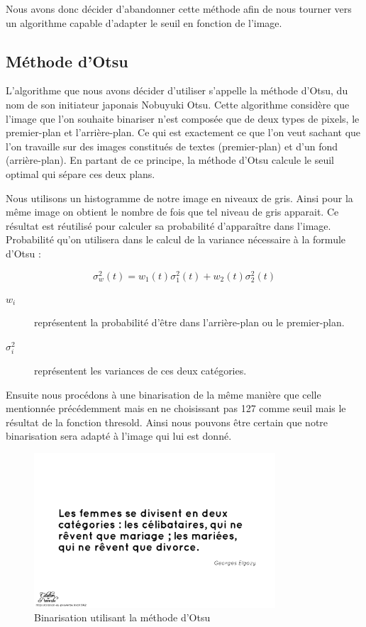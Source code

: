 \documentclass[11pt]{report}
\begin{document}
Nous avons donc décider d'abandonner cette méthode afin de nous tourner vers un algorithme capable d'adapter le seuil en fonction de l'image.

\subsection{Méthode d'Otsu}

L'algorithme que nous avons décider d'utiliser s'appelle la méthode d'Otsu, du nom de son initiateur japonais Nobuyuki Otsu. Cette algorithme considère que l’image que l’on souhaite binariser n’est composée que de deux types de pixels, le premier-plan et l’arrière-plan. Ce qui est exactement ce que l’on veut sachant que l’on travaille sur des images constitués de textes (premier-plan) et d’un fond (arrière-plan). En partant de ce principe, la méthode d'Otsu calcule le seuil optimal qui sépare ces deux plans.

Nous utilisons un histogramme de notre image en niveaux de gris. Ainsi pour la même image on obtient le nombre de fois que tel niveau de gris apparait. Ce résultat est réutilisé pour calculer sa probabilité d’apparaître dans l’image. Probabilité qu’on utilisera dans le calcul de la variance nécessaire à la formule d’Otsu :

\[ \sigma ^{2}_{w} \left( t\right) = w_{1}\left( t\right) \sigma ^{2}_{1}\left( t\right) + w_{2}\left( t\right) \sigma ^{2}_{2}\left( t\right) \]

\begin{description}
\item[$w_{i}$] représentent la probabilité d'être dans l'arrière-plan ou le premier-plan.
\item[$\sigma ^{2}_{i}$] représentent les variances de ces deux catégories.
\end{description}

\medskip

Ensuite nous procédons à une binarisation de la même manière que celle mentionnée précédemment mais en ne choisissant pas 127 comme seuil mais le résultat de la fonction thresold. Ainsi nous pouvons être certain que notre binarisation sera adapté à l’image qui lui est donné.

\begin{figure}[htbp]
\centering
\includegraphics[width=9cm]{b_otsu.png}
\caption{Binarisation utilisant la méthode d'Otsu}
\end{figure}
\end{document}
